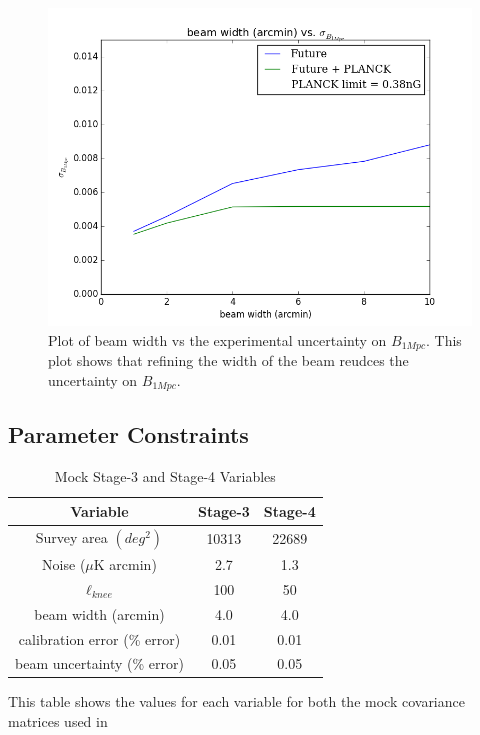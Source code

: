 \begin{figure}[h]
\centering
\includegraphics[scale=0.8]{images/width.png}
\caption{Plot of beam width vs the experimental uncertainty on $B_{1Mpc}$. This plot shows that refining the width of the beam reudces the uncertainty on $B_{1Mpc}$.}
\label{fig:width}
\end{figure}

\subsection{Parameter Constraints}

\begin{table}[h]
\centering
\caption{Mock Stage-3 and Stage-4 Variables}

\label{my-label}
\begin{tabular}{l|l|l}
\multicolumn{1}{c}{Variable} & \multicolumn{1}{|c}{Stage-3} & \multicolumn{1}{|c}{Stage-4} \\ \hline
\multicolumn{1}{c}{Survey area $(deg^2)$} & \multicolumn{1}{|c}{10313} & \multicolumn{1}{|c}{22689}  \\
\multicolumn{1}{c}{Noise ($\mu$K arcmin)} & \multicolumn{1}{|c}{2.7} & \multicolumn{1}{|c}{1.3}  \\
\multicolumn{1}{c}{$\ell_{knee}$} & \multicolumn{1}{|c}{100} & \multicolumn{1}{|c}{50} \\
\multicolumn{1}{c}{beam width (arcmin)} & \multicolumn{1}{|c}{4.0} & \multicolumn{1}{|c}{4.0}   \\
\multicolumn{1}{c}{calibration error (\% error)} & \multicolumn{1}{|c}{0.01} & \multicolumn{1}{|c}{0.01} \\
\multicolumn{1}{c}{beam uncertainty (\% error)} & \multicolumn{1}{|c}{0.05} & \multicolumn{1}{|c}{0.05}
\end{tabular}

\bigskip
\begin{flushleft}
This table shows the values for each variable for both the mock covariance matrices used in 
\end{flushleft}
\end{table}

